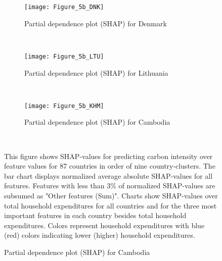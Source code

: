 \begin{figure}[ht!]\ContinuedFloat
    \centering
   \begin{subfigure}[b]{\textwidth}
         \centering
         \caption{Partial dependence plot (SHAP) for Denmark}
         \label{fig:5b_DNK}
         \texttt{[image: Figure\_5b\_DNK]}         
     \end{subfigure}
    \\
    \vspace{0.5cm}
   \begin{subfigure}[b]{\textwidth}
         \centering
         \caption{Partial dependence plot (SHAP) for Lithuania}
         \label{fig:5b_LTU}
         \texttt{[image: Figure\_5b\_LTU]}         
     \end{subfigure}
    \\
    \vspace{0.5cm}
   \begin{subfigure}[b]{\textwidth}
         \centering
         \caption{Partial dependence plot (SHAP) for Cambodia}
         \label{fig:5b_KHM}
         \texttt{[image: Figure\_5b\_KHM]}
    \end{subfigure}
    \\
    \vspace{0.5cm}
    \begin{subcaption2}
     This figure shows SHAP-values for predicting carbon intensity over feature values for 87 countries in order of nine country-clusters. The bar chart displays normalized average absolute SHAP-values for all features. Features with less than 3\% of normalized SHAP-values are subsumed as "Other features (Sum)". Charts show SHAP-values over total household expenditures for all countries and for the three most important features in each country besides total household expenditures. Colors represent household expenditures with blue (red) colors indicating lower (higher) household expenditures.
     \end{subcaption2}
\end{figure}

